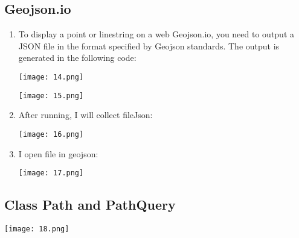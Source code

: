 \documentclass[12pt]{scrartcl}
\begin{document}
\subsection{Geojson.io}
\begin{enumerate}
    \item To display a point or linestring on a web Geojson.io, you need to output a JSON file in the format specified by Geojson standards. The output is generated in the following code:
        \begin{center}
            \texttt{[image: 14.png]}
        \end{center}
                \begin{center}
            \texttt{[image: 15.png]}
        \end{center}
\newpage
    \item After running, I will collect fileJson: 
        \begin{center}
            \texttt{[image: 16.png]}
        \end{center}
    \item I open file in geojson: 
        \begin{center}
            \texttt{[image: 17.png]}
        \end{center}
\end{enumerate}
\newpage
\subsection{Class Path and PathQuery}
        \begin{center}
            \texttt{[image: 18.png]}
        \end{center}
\newpage
\end{document}
